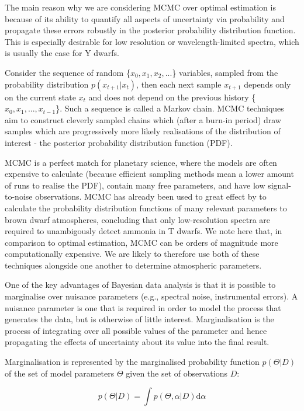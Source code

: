\documentclass[11pt, a4paper,titlepage]{report}
\begin{document}
The main reason why we are considering MCMC over optimal estimation is because of its ability to quantify all aspects of uncertainty via probability and propagate these errors robustly in the posterior probability distribution function. This is especially desirable for low resolution or wavelength-limited spectra, which is usually the case for Y dwarfs.

Consider the sequence of random \{$x_0 ,x_1 ,x_2 ,...$\} variables, sampled from the probability distribution $p(x_{t+1}|x_{t})$, then each next sample $x_{t+1}$ depends only on the current state $x_t$ and does not depend on the previous history \{$x_0 ,x_1 , ..., x_{t-1}$\}. Such a sequence is called a Markov chain. MCMC techniques aim to construct cleverly sampled chains which (after a burn-in period) draw samples which are progressively more likely realisations of the distribution of interest - the posterior probability distribution function (PDF). 

MCMC is a perfect match for planetary science, where the models are often expensive to calculate (because efficient sampling methods mean a lower amount of runs to realise the PDF), contain many free parameters, and have low signal-to-noise observations. MCMC has already been used to great effect by \citet{line15} to calculate the probability distribution functions of many relevant parameters to brown dwarf atmospheres, concluding that only low-resolution spectra are required to unambigously detect ammonia in T dwarfs. We note here that, in comparison to optimal estimation, MCMC can be orders of magnitude more computationally expensive. We are likely to therefore use both of these techniques alongside one another to determine atmospheric parameters. 

One of the key advantages of Bayesian data analysis is that it is possible to marginalise over nuisance parameters (e.g., spectral noise, instrumental errors).  A nuisance parameter is one that is required in order to model the process that generates the data, but is otherwise of little interest. Marginalisation is the process of integrating over all possible values of the parameter and hence propagating the effects of uncertainty about its value into the final result. 

Marginalisation is represented by the marginalised probability function $p(\Theta | D)$ of the set of model parameters $\Theta$ given the set of observations $D$:

\begin{equation}
p(\Theta | D)= \int p(\Theta, \alpha | D) \mathrm{d} \alpha
\end{equation}
\end{document}
